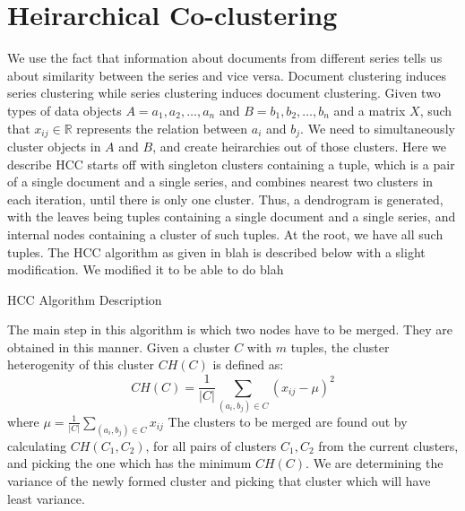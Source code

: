 \documentclass[11pt,twocolumn]{article}
\begin{document}
\section{Heirarchical Co-clustering}
We use the fact that information about documents from different series tells us about similarity between the series and vice versa. Document clustering induces series clustering while series clustering induces document clustering.
Given two types of data objects $A={a_1,a_2,\ldots,a_n}$ and $B={b_1,b_2,\ldots,b_n}$ and a matrix $X$, such that $x_{ij} \in \mathbb{R}$ represents the relation between $a_i$ and $b_j$. We need to simultaneously cluster objects in $A$ and $B$, and create heirarchies out of those clusters.
Here we describe 
HCC starts off with singleton clusters containing a tuple, which is a pair of a single document and a single series, and combines nearest two clusters in each iteration, until there is only one cluster. Thus, a dendrogram is generated, with the leaves being tuples containing a single document and a single series, and internal nodes containing a cluster of such tuples. At the root, we have all such tuples.
The HCC algorithm as given in blah is described below with a slight modification. We modified it to be able to do blah
\begin{algorithm}[H]
  \caption{HCC Algorithm Description}
  \label{hcc_algo}
  \begin{algorithmic}
    \ENDFOR
  \end{algorithmic}
\end{algorithm}
The main step in this algorithm is which two nodes have to be merged. They are obtained in this manner.
Given a cluster $C$ with $m$ tuples, the cluster heterogenity of this cluster $CH(C)$ is defined as:
\begin{displaymath}
  CH(C)=\frac{1}{|C|}\sum_{(a_i,b_j) \in C}(x_{ij}-\mu)^2
\end{displaymath}
where $\mu=\frac{1}{|C|}\sum_{(a_i,b_j) \in C}x_{ij}$
The clusters to be merged are found out by calculating $CH(C_1,C_2)$, for all pairs of clusters $C_1,C_2$ from the current clusters, and picking the one which has the minimum $CH(C)$. We are determining the variance of the newly formed cluster and picking that cluster which will have least variance.
\end{document}

